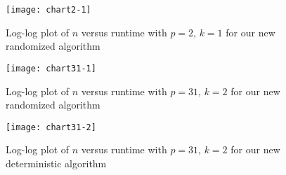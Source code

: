 \documentclass{jams-l}
\theoremstyle{remark}
\numberwithin{equation}{section}
\begin{document}
\begin{figure}\label{fig:figure1}
\centering
  \texttt{[image: chart2-1]}
  \caption{Log-log plot of $n$ versus runtime with $p = 2$, $k = 1$ for our new randomized algorithm}
\end{figure}

\begin{figure}\label{fig:figure2}
\centering
  \texttt{[image: chart31-1]}
  \caption{Log-log plot of $n$ versus runtime with $p = 31$, $k = 2$ for our new randomized algorithm}
\end{figure}

\begin{figure}\label{fig:figure3}
\centering
  \texttt{[image: chart31-2]}
  \caption{Log-log plot of $n$ versus runtime with $p = 31$, $k = 2$ for our new deterministic algorithm}
\end{figure}







{}

\end{document}
